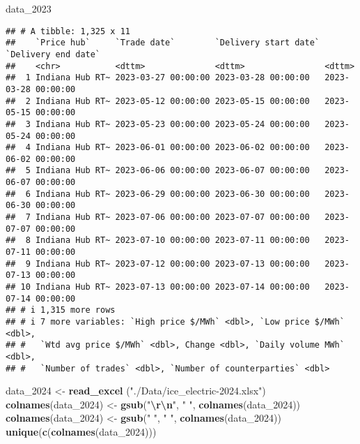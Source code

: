 \documentclass[
]{article}
\newenvironment{Shaded}{\begin{snugshade}}{\end{snugshade}}
\newcommand{\FunctionTok}[1]{\textcolor[rgb]{0.13,0.29,0.53}{\textbf{#1}}}
\newcommand{\NormalTok}[1]{#1}
\newcommand{\OtherTok}[1]{\textcolor[rgb]{0.56,0.35,0.01}{#1}}
\newcommand{\SpecialCharTok}[1]{\textcolor[rgb]{0.81,0.36,0.00}{\textbf{#1}}}
\newcommand{\StringTok}[1]{\textcolor[rgb]{0.31,0.60,0.02}{#1}}
\begin{document}
\begin{Shaded}
\begin{Highlighting}[]
\NormalTok{data\_2023}
\end{Highlighting}
\end{Shaded}

\begin{verbatim}
## # A tibble: 1,325 x 11
##    `Price hub`     `Trade date`        `Delivery start date` `Delivery end date`
##    <chr>           <dttm>              <dttm>                <dttm>             
##  1 Indiana Hub RT~ 2023-03-27 00:00:00 2023-03-28 00:00:00   2023-03-28 00:00:00
##  2 Indiana Hub RT~ 2023-05-12 00:00:00 2023-05-15 00:00:00   2023-05-15 00:00:00
##  3 Indiana Hub RT~ 2023-05-23 00:00:00 2023-05-24 00:00:00   2023-05-24 00:00:00
##  4 Indiana Hub RT~ 2023-06-01 00:00:00 2023-06-02 00:00:00   2023-06-02 00:00:00
##  5 Indiana Hub RT~ 2023-06-06 00:00:00 2023-06-07 00:00:00   2023-06-07 00:00:00
##  6 Indiana Hub RT~ 2023-06-29 00:00:00 2023-06-30 00:00:00   2023-06-30 00:00:00
##  7 Indiana Hub RT~ 2023-07-06 00:00:00 2023-07-07 00:00:00   2023-07-07 00:00:00
##  8 Indiana Hub RT~ 2023-07-10 00:00:00 2023-07-11 00:00:00   2023-07-11 00:00:00
##  9 Indiana Hub RT~ 2023-07-12 00:00:00 2023-07-13 00:00:00   2023-07-13 00:00:00
## 10 Indiana Hub RT~ 2023-07-13 00:00:00 2023-07-14 00:00:00   2023-07-14 00:00:00
## # i 1,315 more rows
## # i 7 more variables: `High price $/MWh` <dbl>, `Low price $/MWh` <dbl>,
## #   `Wtd avg price $/MWh` <dbl>, Change <dbl>, `Daily volume MWh` <dbl>,
## #   `Number of trades` <dbl>, `Number of counterparties` <dbl>
\end{verbatim}

\begin{Shaded}
\begin{Highlighting}[]
\NormalTok{data\_2024 }\OtherTok{\textless{}{-}} \FunctionTok{read\_excel}\NormalTok{ (}\StringTok{"./Data/ice\_electric{-}2024.xlsx"}\NormalTok{)}
\FunctionTok{colnames}\NormalTok{(data\_2024) }\OtherTok{\textless{}{-}} \FunctionTok{gsub}\NormalTok{(}\StringTok{"}\SpecialCharTok{\textbackslash{}r\textbackslash{}n}\StringTok{"}\NormalTok{, }\StringTok{" "}\NormalTok{, }\FunctionTok{colnames}\NormalTok{(data\_2024))}
\FunctionTok{colnames}\NormalTok{(data\_2024) }\OtherTok{\textless{}{-}} \FunctionTok{gsub}\NormalTok{(}\StringTok{"  "}\NormalTok{, }\StringTok{" "}\NormalTok{, }\FunctionTok{colnames}\NormalTok{(data\_2024))}
\FunctionTok{unique}\NormalTok{(}\FunctionTok{c}\NormalTok{(}\FunctionTok{colnames}\NormalTok{(data\_2024)))}
\end{Highlighting}
\end{Shaded}
\end{document}

